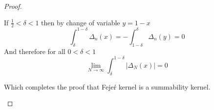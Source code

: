 \begin{proof}
\begin{enumerate}[label=(\alph*)]
        If $\frac{1}{2} < \delta < 1$ then by change of variable $y = 1 - x$
        \begin{displaymath}
          \int_\delta^{1-\delta} \Delta_n(x) =  - \int_{1-\delta}^{\delta} \Delta_n(y) = 0
        \end{displaymath}
        And therefore for all $0 < \delta < 1$ 
        \begin{displaymath}
          \lim_{N \to \infty} \int_\delta^{1-\delta} \left|\Delta_N(x)\right| =  0
        \end{displaymath}


      Which completes the proof that  Feje\'r kernel is a summability kernel.
    \end{enumerate}
  \end{proof}



